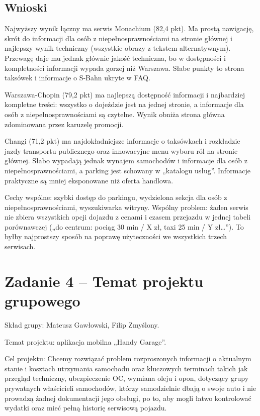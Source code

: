 \documentclass[11pt,a4paper]{article}
\begin{document}
\subsection{Wnioski}

Najwyższy wynik łączny ma serwis Monachium (82,4 pkt). Ma prostą nawigację, skrót do informacji dla osób z niepełnosprawnościami na stronie głównej i najlepszy wynik techniczny (wszystkie obrazy z tekstem alternatywnym). Przewagę daje mu jednak głównie jakość techniczna, bo w dostępności i kompletności informacji wypada gorzej niż Warszawa. Słabe punkty to strona taksówek i informacje o S-Bahn ukryte w FAQ.

Warszawa-Chopin (79,2 pkt) ma najlepszą dostępność informacji i najbardziej kompletne treści: wszystko o dojeździe jest na jednej stronie, a informacje dla osób z niepełnosprawnościami są czytelne. Wynik obniża strona główna zdominowana przez karuzelę promocji.

Changi (71,2 pkt) ma najdokładniejsze informacje o taksówkach i rozkładzie jazdy transportu publicznego oraz innowacyjne menu wyboru ról na stronie głównej. Słabo wypadają jednak wynajem samochodów i informacje dla osób z niepełnosprawnościami, a parking jest schowany w „katalogu usług”. Informacje praktyczne są mniej eksponowane niż oferta handlowa.

Cechy wspólne: szybki dostęp do parkingu, wydzielona sekcja dla osób z niepełnosprawnościami, wyszukiwarka witryny. Wspólny problem: żaden serwis nie zbiera wszystkich opcji dojazdu z cenami i czasem przejazdu w jednej tabeli porównawczej („do centrum: pociąg 30 min / X zł, taxi 25 min / Y zł\dots”). To byłby najprostszy sposób na poprawę użyteczności we wszystkich trzech serwisach.

\newpage
\section{Zadanie 4 -- Temat projektu grupowego}

Skład grupy: Mateusz Gawłowski, Filip Zmyślony.

Temat projektu: aplikacja mobilna „Handy Garage”.

Cel projektu: Chcemy rozwiązać problem rozproszonych informacji o aktualnym stanie i kosztach utrzymania samochodu oraz kluczowych terminach takich jak przegląd techniczny, ubezpieczenie OC, wymiana oleju i opon, dotyczący grupy prywatnych właścicieli samochodów, którzy samodzielnie dbają o swoje auto i nie prowadzą żadnej dokumentacji jego obsługi, po to, aby mogli łatwo kontrolować wydatki oraz mieć pełną historię serwisową pojazdu.
\end{document}
